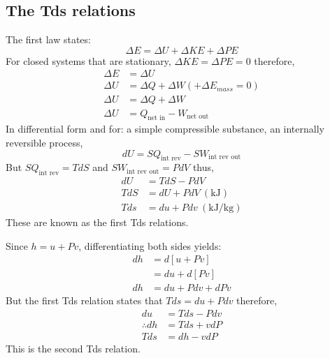 \documentclass[class=report, crop=false, 12pt,a4paper]{standalone}
\numberwithin{equation}{section}
\begin{document}
\subsection{The Tds relations}
The first law states:
\begin{equation} 
  \Delta E = \Delta U + \Delta KE + \Delta PE 
\end{equation}
For closed systems that are stationary, \( \Delta KE = \Delta PE = 0 \) therefore, 
\begin{align}
  \Delta E &= \Delta U\\
  \Delta U &= \Delta Q + \Delta W (+ \Delta E_{mass} = 0)\\
  \Delta U &= \Delta Q + \Delta W\\
  \Delta U &= Q_{\textrm{net in}} - W_{\textrm{net out}}
\end{align}
In differential form and for: a simple compressible substance, an internally reversible process,
\begin{equation} 
  dU = SQ_{\textrm{int rev}} - SW_{\textrm{int rev out}} 
\end{equation}
But \( SQ_{\textrm{int rev}} = T dS \) and \( SW_{\textrm{int rev out}} = PdV\) thus,
\begin{align} 
  dU &= TdS - PdV\\
  TdS &= dU + PdV \ (\si{\kilo\joule})\\
  Tds &= du + Pdv \ (\si{\kilo\joule\per\kg})
\end{align}
These are known as the first Tds relations.

Since \( h = u + Pv \), differentiating both sides yields:
\begin{align}
  dh &= d[u+Pv]\\
  &= du + d[Pv]\\
  dh &= du + Pdv + dPv
\end{align}
But the first Tds relation states that \(Tds = du + Pdv\) therefore, 
\begin{align}
  du &= Tds - Pdv\\
  \therefore dh &= Tds + vdP\\
  Tds &= dh - vdP
\end{align}
This is the second Tds relation.
\end{document}
